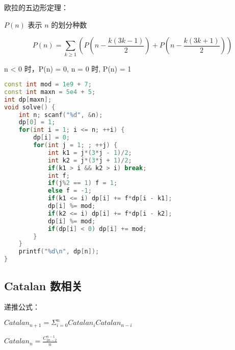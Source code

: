 欧拉的五边形定理：

$P(n)$ 表示 $n$ 的划分种数

$$P(n) = \sum_{k \ge 1} (P(n - \frac{k(3k - 1)}{2}) + P(n - \frac{k(3k + 1)}{2}))$$

n < 0 时，P(n) = 0, n = 0 时, P(n) = 1

\begin{lstlisting}[language=C++]
const int mod = 1e9 + 7;
const int maxn = 5e4 + 5;
int dp[maxn];
void solve() {
    int n; scanf("%d", &n);
    dp[0] = 1;
    for(int i = 1; i <= n; ++i) {
        dp[i] = 0;
        for(int j = 1; ; ++j) {
            int k1 = j*(3*j - 1)/2;
            int k2 = j*(3*j + 1)/2;
            if(k1 > i && k2 > i) break;
            int f;
            if(j%2 == 1) f = 1;
            else f = -1;
            if(k1 <= i) dp[i] += f*dp[i - k1];
            dp[i] %= mod;
            if(k2 <= i) dp[i] += f*dp[i - k2];
            dp[i] %= mod;
            if(dp[i] < 0) dp[i] += mod;
        }
    }
    printf("%d\n", dp[n]);
}
\end{lstlisting}

\subsection{Catalan 数相关}

递推公式：

$Catalan_{n + 1} = \Sigma _ {i = 0} ^ {n} Catalan_{i} Catalan_{n - i}$

$Catalan_{n} = \frac{C_{2n - 2} ^ {n - 1}}{n}$
